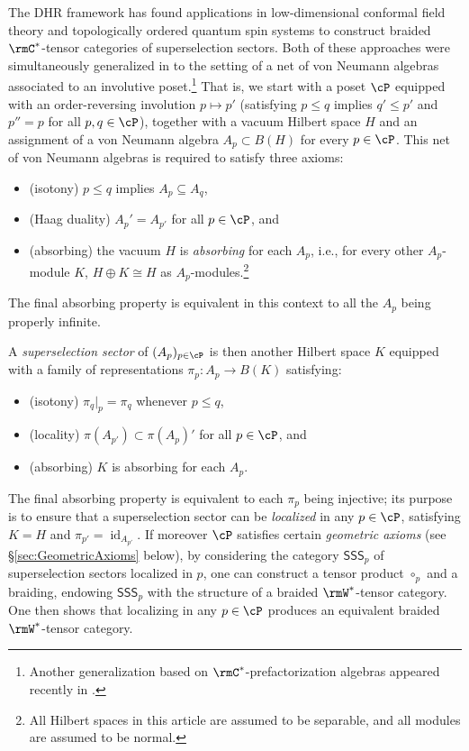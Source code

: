 \documentclass[11pt,reqno]{amsart}
\DeclareMathOperator{\id}{id}
\newcommand{\SSS}{\mathsf{SSS}}
\numberwithin{equation}{section}
\theoremstyle{plain}
\theoremstyle{definition}
\begin{document}
The DHR framework has found applications in low-dimensional conformal field theory \cite{MR660538,MR1231644} and topologically ordered quantum spin systems \cite{MR2804555,MR4362722} to construct braided $\rmC^*$-tensor categories of superselection sectors.
Both of these approaches were simultaneously generalized in \cite{MR4927814} to the setting of a net of von Neumann algebras associated to an involutive poset.\footnote{Another generalization based on $\rmC^*$-prefactorization algebras appeared recently in \cite{MR4998903}.}
That is, we start with a poset $\cP$ equipped with an order-reversing involution $p\mapsto p'$ (satisfying $p\leq q$ implies $q'\leq p'$ and $p''=p$ for all $p,q\in \cP$), together with a vacuum Hilbert space $H$ and an assignment of a von Neumann algebra $A_p\subset B(H)$ for every $p\in \cP$.
This net of von Neumann algebras is required to satisfy three axioms:
\begin{itemize}
\item 
(isotony)
$p\leq q$ implies $A_p\subseteq A_q$,
\item 
(Haag duality)
$A_p' = A_{p'}$ for all $p\in \cP$, and 
\item 
(absorbing) the vacuum $H$ is \emph{absorbing} for each $A_p$, i.e., for every other $A_p$-module $K$, $H\oplus K\cong H$ as $A_p$-modules.\footnote{All Hilbert spaces in this article are assumed to be separable, and all modules are assumed to be normal.}
\end{itemize}
The final absorbing property is equivalent in this context to all the $A_p$ being properly infinite.

A \emph{superselection sector} of $(A_p)_{p\in \cP}$ is then another Hilbert space $K$ equipped with a family of representations $\pi_p: A_p\to B(K)$ satisfying:
\begin{itemize}
\item 
(isotony)
$\pi_q|_p=\pi_q$ whenever $p\leq q$,
\item 
(locality)
$\pi(A_{p'})\subset \pi(A_p)'$ for all $p\in \cP$, and
\item 
(absorbing) $K$ is absorbing for each $A_p$.
\end{itemize}
The final absorbing property is equivalent to each $\pi_p$ being injective; its purpose is to ensure that a superselection sector can be \emph{localized} in any $p\in \cP$, satisfying $K=H$ and $\pi_{p'}=\id_{A_{p'}}$.
If moreover $\cP$ satisfies certain \emph{geometric axioms} (see \S\ref{sec:GeometricAxioms} below), by considering the category $\SSS_p$ of superselection sectors localized in $p$, one can construct a tensor product $\circ_p$ and a braiding, endowing $\SSS_p$ with the structure of a braided $\rmW^*$-tensor category.
One then shows that localizing in any $p\in\cP$ produces an equivalent braided $\rmW^*$-tensor category.
\end{document}

